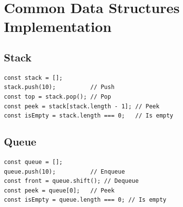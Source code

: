 \documentclass{article}
\begin{document}
\section{Common Data Structures Implementation}

\subsection{Stack}
\begin{lstlisting}
const stack = [];
stack.push(10);          // Push
const top = stack.pop(); // Pop
const peek = stack[stack.length - 1]; // Peek
const isEmpty = stack.length === 0;   // Is empty
\end{lstlisting}

\subsection{Queue}
\begin{lstlisting}
const queue = [];
queue.push(10);          // Enqueue
const front = queue.shift(); // Dequeue
const peek = queue[0];   // Peek
const isEmpty = queue.length === 0; // Is empty
\end{lstlisting}
\end{document}
